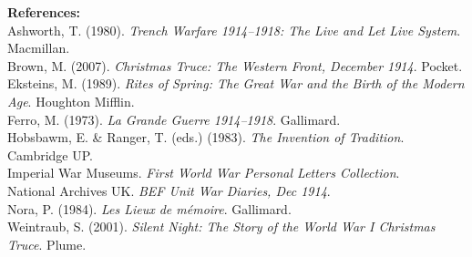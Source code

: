 \begin{technical}
\vspace{0.5em}
\noindent\textbf{References:}\\
Ashworth, T. (1980). \textit{Trench Warfare 1914–1918: The Live and Let Live System}. Macmillan.\\
Brown, M. (2007). \textit{Christmas Truce: The Western Front, December 1914}. Pocket.\\
Eksteins, M. (1989). \textit{Rites of Spring: The Great War and the Birth of the Modern Age}. Houghton Mifflin.\\
Ferro, M. (1973). \textit{La Grande Guerre 1914–1918}. Gallimard.\\
Hobsbawm, E. & Ranger, T. (eds.) (1983). \textit{The Invention of Tradition}. Cambridge UP.\\
Imperial War Museums. \textit{First World War Personal Letters Collection}.\\
National Archives UK. \textit{BEF Unit War Diaries, Dec 1914}.\\
Nora, P. (1984). \textit{Les Lieux de mémoire}. Gallimard.\\
Weintraub, S. (2001). \textit{Silent Night: The Story of the World War I Christmas Truce}. Plume.
\end{technical}

